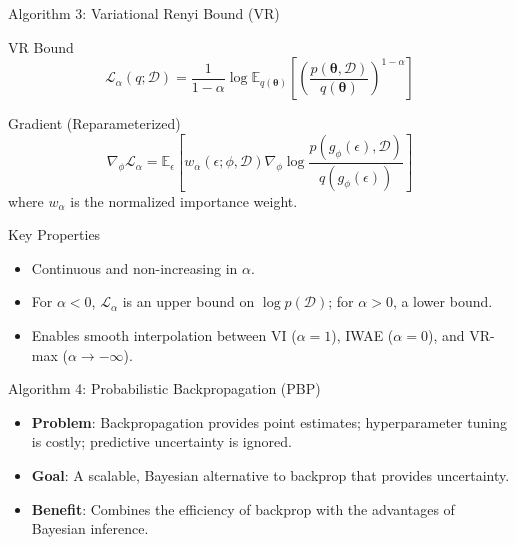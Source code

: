\documentclass[10pt]{beamer}
\begin{document}
\begin{frame}{Algorithm 3: Variational Renyi Bound (VR)}

\begin{block}{VR Bound}
\[
\mathcal{L}_\alpha(q; \mathcal{D}) = \frac{1}{1-\alpha} \log \mathbb{E}_{q(\boldsymbol{\theta})} \left[ \left( \frac{p(\boldsymbol{\theta}, \mathcal{D})}{q(\boldsymbol{\theta})} \right)^{1-\alpha} \right]
\]
\end{block}

\begin{block}{Gradient (Reparameterized)}
\[
\nabla_{\phi} \mathcal{L}_{\alpha} = \mathbb{E}_{\epsilon} \left[ w_{\alpha}(\epsilon; \phi, \mathcal{D}) \nabla_{\phi} \log \frac{p(g_{\phi}(\epsilon), \mathcal{D})}{q(g_{\phi}(\epsilon))} \right]
\]
where $w_{\alpha}$ is the normalized importance weight.
\end{block}

\begin{block}{Key Properties}
\begin{itemize}
    \item Continuous and non-increasing in $\alpha$.
    \item For $\alpha < 0$, $\mathcal{L}_\alpha$ is an upper bound on $\log p(\mathcal{D})$; for $\alpha > 0$, a lower bound.
    \item Enables smooth interpolation between VI ($\alpha=1$), IWAE ($\alpha=0$), and VR-max ($\alpha \to -\infty$).
\end{itemize}
\end{block}
\end{frame}



\begin{frame}{Algorithm 4: Probabilistic Backpropagation (PBP)}

\begin{itemize}
    \item \textbf{Problem}: Backpropagation provides point estimates; hyperparameter tuning is costly; predictive uncertainty is ignored.
    \item \textbf{Goal}: A scalable, Bayesian alternative to backprop that provides uncertainty.
    \item \textbf{Benefit}: Combines the efficiency of backprop with the advantages of Bayesian inference.
\end{itemize}
\end{frame}
\end{document}
